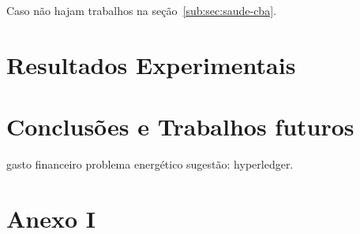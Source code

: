 \documentclass[a4paper,11pt]{article}
\begin{document}
Caso não hajam trabalhos na seção~\ref{sub:sec:saude-cba}.

\newpage
\section{Resultados Experimentais}



\newpage
\section{Conclusões e Trabalhos futuros}

gasto financeiro
problema energético
sugestão: hyperledger.




\newpage
\section{Anexo I}
\end{document}
